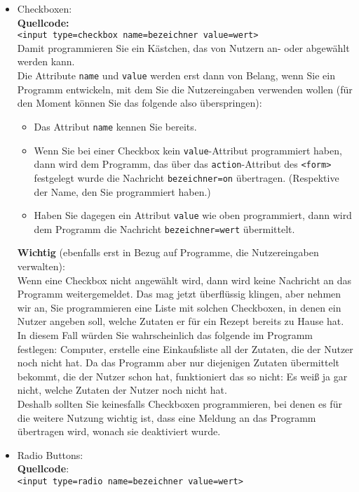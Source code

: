 \begin{itemize}
	\item Checkboxen:\\
	\textbf{Quellcode:}\\\verb|<input type=checkbox name=bezeichner value=wert>|\\
	Damit programmieren Sie ein Kästchen, das von Nutzern an- oder abgewählt werden kann.\\
	Die Attribute \verb|name| und \verb|value| werden erst dann von Belang, wenn Sie ein Programm entwickeln, mit dem Sie die Nutzereingaben verwenden wollen (für den Moment können Sie das folgende also überspringen): 
	
	\begin{itemize}
		\item Das Attribut \verb|name| kennen Sie bereits. 
		\item Wenn Sie bei einer Checkbox kein \verb|value|-Attribut programmiert haben, dann wird dem Programm, das über das \verb|action|-Attribut des \verb|<form>| festgelegt wurde die Nachricht \verb|bezeichner=on| übertragen. (Respektive der Name, den Sie programmiert haben.)
		\item Haben Sie dagegen ein Attribut \verb|value| wie oben programmiert, dann wird dem Programm die Nachricht \verb|bezeichner=wert| übermittelt.
	\end{itemize}
	
	\textbf{Wichtig} (ebenfalls erst in Bezug auf Programme, die Nutzereingaben verwalten):\\	
	Wenn eine Checkbox nicht angewählt wird, dann wird keine Nachricht an das Programm weitergemeldet. Das mag jetzt überflüssig klingen, aber nehmen wir an, Sie programmieren eine Liste mit solchen Checkboxen, in denen ein Nutzer angeben soll, welche Zutaten er für ein Rezept bereits zu Hause hat. In diesem Fall würden Sie wahrscheinlich das folgende im Programm festlegen: Computer, erstelle eine Einkaufsliste all der Zutaten, die der Nutzer noch nicht hat. Da das Programm aber nur diejenigen Zutaten übermittelt bekommt, die der Nutzer schon hat, funktioniert das so nicht: Es weiß ja gar nicht, welche Zutaten der Nutzer noch nicht hat.\\

	Deshalb sollten Sie keinesfalls Checkboxen programmieren, bei denen es für die weitere Nutzung wichtig ist, dass eine Meldung an das Programm übertragen wird, wonach sie deaktiviert wurde.\\

	\item Radio Buttons:\\
	\textbf{Quellcode}: \\\verb|<input type=radio name=bezeichner value=wert>|

\end{itemize}

